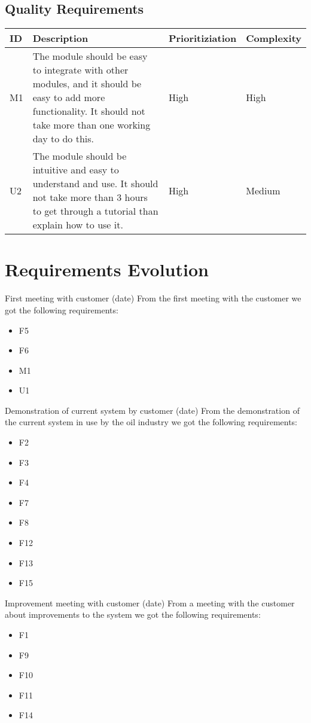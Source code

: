 \documentclass{report}
\begin{document}
\subsection{Quality Requirements} \label{subsec:quality_requirements}
\begin{tabular}{| l | p{5.9cm} | l | l |} \hline
ID & Description & Prioritiziation & Complexity \\ \hline
M1 & The module should be easy to integrate with other modules, and it should be easy to add more functionality. It should not take more than one working day to do this. & High & High \\ \hline
U2 & The module should be intuitive and easy to understand and use. It should not take more than 3 hours to get through a tutorial than explain how to use it. & High & Medium \\ \hline
\end{tabular}

\section{Requirements Evolution} \label{sec:requirements_evolution}
First meeting with customer (date)
From the first meeting with the customer we got the following requirements:
\begin{itemize}
    \item F5
    \item F6
    \item M1
    \item U1
\end{itemize}

Demonstration of current system by customer (date)
From the demonstration of the current system in use by the oil industry we got the following requirements:
\begin{itemize}
    \item F2
    \item F3
    \item F4
    \item F7
    \item F8
    \item F12
    \item F13
    \item F15
\end{itemize}

Improvement meeting with customer (date)
From a meeting with the customer about improvements to the system we got the following requirements:
\begin{itemize}
    \item F1
    \item F9
    \item F10
    \item F11
    \item F14
\end{itemize}
\end{document}

